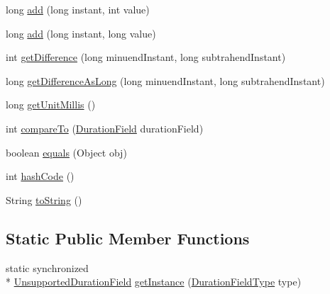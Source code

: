 \begin{DoxyCompactItemize}
\item 
long \hyperlink{classorg_1_1joda_1_1time_1_1field_1_1_unsupported_duration_field_ad5033411db66704f889d9d9200a3b6d3}{add} (long instant, int value)
\item 
long \hyperlink{classorg_1_1joda_1_1time_1_1field_1_1_unsupported_duration_field_a61fba4566d7fceb319b586e02b1ac8ca}{add} (long instant, long value)
\item 
int \hyperlink{classorg_1_1joda_1_1time_1_1field_1_1_unsupported_duration_field_a5d3c2ed76857389cb8db63b309f9b69a}{get\-Difference} (long minuend\-Instant, long subtrahend\-Instant)
\item 
long \hyperlink{classorg_1_1joda_1_1time_1_1field_1_1_unsupported_duration_field_aea117cfe5a42fb6fef4200b051755423}{get\-Difference\-As\-Long} (long minuend\-Instant, long subtrahend\-Instant)
\item 
long \hyperlink{classorg_1_1joda_1_1time_1_1field_1_1_unsupported_duration_field_aa13917f22919900c2ed2c52df8cdd232}{get\-Unit\-Millis} ()
\item 
int \hyperlink{classorg_1_1joda_1_1time_1_1field_1_1_unsupported_duration_field_ad3f5b0dc0f81c195029e9fcf01c97bf4}{compare\-To} (\hyperlink{classorg_1_1joda_1_1time_1_1_duration_field}{Duration\-Field} duration\-Field)
\item 
boolean \hyperlink{classorg_1_1joda_1_1time_1_1field_1_1_unsupported_duration_field_ad923f3d6b70745781ddb5210a40c27a3}{equals} (Object obj)
\item 
int \hyperlink{classorg_1_1joda_1_1time_1_1field_1_1_unsupported_duration_field_af4034b0de9e927734b29edf5b11cb7d5}{hash\-Code} ()
\item 
String \hyperlink{classorg_1_1joda_1_1time_1_1field_1_1_unsupported_duration_field_aff51efdae45762b51d65ffd2b1a0519f}{to\-String} ()
\end{DoxyCompactItemize}
\subsection*{Static Public Member Functions}
\begin{DoxyCompactItemize}
\item 
static synchronized \\*
\hyperlink{classorg_1_1joda_1_1time_1_1field_1_1_unsupported_duration_field}{Unsupported\-Duration\-Field} \hyperlink{classorg_1_1joda_1_1time_1_1field_1_1_unsupported_duration_field_ab1cbd65912510015bc054709eb899307}{get\-Instance} (\hyperlink{classorg_1_1joda_1_1time_1_1_duration_field_type}{Duration\-Field\-Type} type)
\end{DoxyCompactItemize}


